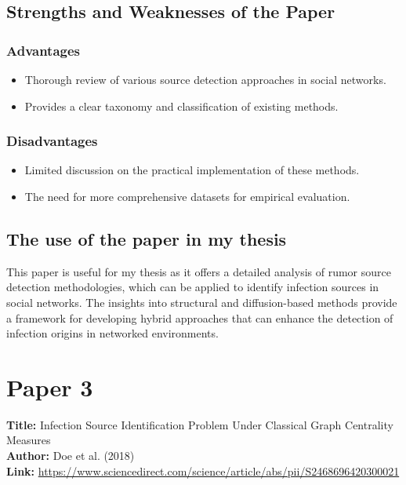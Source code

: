 \subsection{Strengths and Weaknesses of the Paper}

\subsubsection{Advantages}

\begin{itemize}
    \item Thorough review of various source detection approaches in social networks.
    \item Provides a clear taxonomy and classification of existing methods.
\end{itemize}

\subsubsection{Disadvantages}

\begin{itemize}
    \item Limited discussion on the practical implementation of these methods.
    \item The need for more comprehensive datasets for empirical evaluation.
\end{itemize}

\subsection{The use of the paper in my thesis}

This paper is useful for my thesis as it offers a detailed analysis of rumor source detection methodologies, which can be applied to identify infection sources in social networks. The insights into structural and diffusion-based methods provide a framework for developing hybrid approaches that can enhance the detection of infection origins in networked environments.

\section{Paper 3}
\textbf{Title:} Infection Source Identification Problem Under Classical Graph Centrality Measures \\
\textbf{Author:} Doe et al. (2018) \\
\textbf{Link:} \url{https://www.sciencedirect.com/science/article/abs/pii/S2468696420300021}

